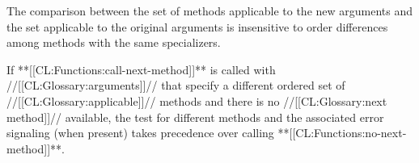 The comparison between the set of methods applicable to the
new arguments and the set applicable to the original arguments is
insensitive to order differences among methods with the same
specializers.
 
If **[[CL:Functions:call-next-method]]** is called with //[[CL:Glossary:arguments]]// that specify
a different ordered set of //[[CL:Glossary:applicable]]// methods and there is no 
//[[CL:Glossary:next method]]// available, the test for different methods and the 
associated error signaling (when present) takes precedence over calling
**[[CL:Functions:no-next-method]]**.

\endsubsubsection%

\endsubSection%



